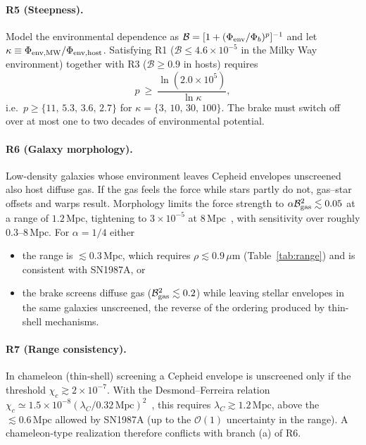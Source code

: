 \documentclass[aps,prd,reprint,superscriptaddress,nofootinbib,floatfix]{revtex4-2}
\theoremstyle{definition}
\newcommand{\Mpc}{\,\mathrm{Mpc}}
\newcommand{\um}{\,\mu\mathrm{m}}
\begin{document}
\paragraph*{R5 (Steepness).} Model the environmental dependence as $\mathcal{B}=[1+(\Phi_{\rm env}/\Phi_b)^p]^{-1}$ and let $\kappa\equiv\Phi_{\rm env,MW}/\Phi_{\rm env,host}$. Satisfying R1 ($\mathcal{B}\le4.6\times10^{-5}$ in the Milky Way environment) together with R3 ($\mathcal{B}\ge0.9$ in hosts) requires
\begin{equation}
p\ \ge\ \frac{\ln(2.0\times10^{5})}{\ln\kappa}, \label{eq:steep}
\end{equation}
i.e.\ $p\ge\{11,\,5.3,\,3.6,\,2.7\}$ for $\kappa=\{3,\,10,\,30,\,100\}$.
The brake must switch off over at most one to two decades of environmental potential.

\paragraph*{R6 (Galaxy morphology).} Low-density galaxies whose environment leaves Cepheid envelopes unscreened also host diffuse gas. If the gas feels the force while stars partly do not, gas--star offsets and warps result. Morphology limits the force strength to $\alpha\mathcal{B}_{\rm gas}^2\lesssim0.05$ at a range of $1.2\Mpc$, tightening to $3\times10^{-5}$ at $8\Mpc$~\cite{DesmondFerreira2020,Desmond2018}, with sensitivity over roughly $0.3\text{--}8\Mpc$. For $\alpha=1/4$ either
\begin{itemize}
\item[(a)] the range is $\lesssim0.3\Mpc$, which requires $\rho\lesssim0.9\um$ (Table~\ref{tab:range}) and is consistent with SN1987A, or
\item[(b)] the brake screens diffuse gas ($\mathcal{B}_{\rm gas}^2\lesssim0.2$) while leaving stellar envelopes in the same galaxies unscreened, the reverse of the ordering produced by thin-shell mechanisms.
\end{itemize}

\paragraph*{R7 (Range consistency).} In chameleon (thin-shell) screening a Cepheid envelope is unscreened only if the threshold $\chi_c\gtrsim2\times10^{-7}$. With the Desmond--Ferreira relation $\chi_c\simeq1.5\times10^{-8}(\lambda_C/0.32\Mpc)^2$~\cite{DesmondFerreira2020}, this requires $\lambda_C\gtrsim1.2\Mpc$, above the $\lesssim0.6\Mpc$ allowed by SN1987A (up to the $\mathcal{O}(1)$ uncertainty in the range). A chameleon-type realization therefore conflicts with branch (a) of R6.
\end{document}
